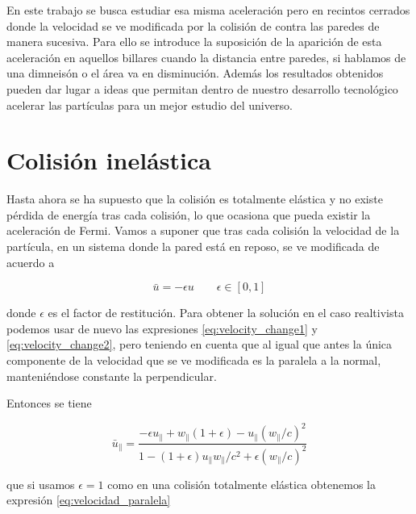 \documentclass[11pt, spanish]{book}
\begin{document}
\vspace{3mm}

\textcolor{green!70!black}{
En este trabajo se busca estudiar esa misma aceleración pero en recintos cerrados donde la velocidad se ve modificada por la colisión de contra las paredes de manera sucesiva. Para ello se introduce la suposición de la aparición de esta aceleración en aquellos billares cuando la distancia entre paredes, si hablamos de una dimneisón o el área va en disminución. Además los resultados obtenidos pueden dar lugar a ideas que permitan dentro de nuestro desarrollo tecnológico acelerar las partículas para un mejor estudio del universo.} 

\section{Colisión inelástica}

Hasta ahora se ha supuesto que la colisión es totalmente elástica y no existe pérdida de energía tras cada colisión, lo que ocasiona que pueda existir la aceleración de Fermi. Vamos a suponer que tras cada colisión la velocidad de la partícula, en un sistema donde la pared está en reposo, se ve modificada de acuerdo a 

\begin{equation}
    \bar{u} = -\epsilon u \qquad \epsilon \in \left[ 0, 1 \right]
\end{equation}

donde \( \epsilon \) es el factor de restitución. Para obtener la solución en el caso realtivista podemos usar de nuevo las expresiones \ref{eq:velocity_change1} y \ref{eq:velocity_change2}, pero teniendo en cuenta que al igual que antes la única componente de la velocidad que se ve modificada es la paralela a la normal, manteniéndose constante la perpendicular. 

\vspace{3mm}

Entonces se tiene

\begin{equation}
    \bar{u}_\parallel = \dfrac{-\epsilon u_\parallel + w_\parallel (1 + \epsilon) -  u_\parallel (w_\parallel/c)^2}{1 - (1 + \epsilon)u_\parallel w_\parallel/c^2 + \epsilon (w_\parallel/c)^2}
\end{equation}

que si usamos \( \epsilon = 1 \) como en una colisión totalmente elástica obtenemos la expresión \ref{eq:velocidad_paralela}

\vspace{3mm}
\end{document}
